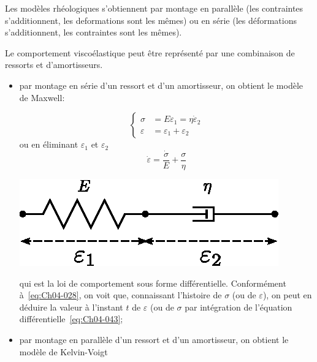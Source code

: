 Les modèles rhéologiques s'obtiennent par montage en parallèle (les contraintes s'additionnent, les deformations sont les mêmes) ou en série (les déformations s'additionnent, les contraintes sont les mêmes).

Le comportement viscoélastique peut être représenté par une combinaison de ressorts et d'amortisseurs. 
\begin{itemize}
    \item par montage en série d'un ressort et d'un amortisseur, on obtient le modèle de Maxwell:
        \begin{multicols}{2}
            \begin{equation}
                \left\{
                \begin{aligned}
                    \sigma &= E \varepsilon_1 = \eta \dot{\varepsilon}_2 \\
                    \varepsilon &= \varepsilon_1 + \varepsilon_2
                \end{aligned}
                \right.
                \label{eq:Ch04-042}
            \end{equation}
            ou en éliminant $\varepsilon_1$ et $\varepsilon_2$
            \begin{equation}
                \dot \varepsilon = \frac{\dot \sigma}{E} + \frac{\sigma}{\eta}
                \label{eq:Ch04-043}
            \end{equation}
            \columnbreak
            \begin{center}
                \includegraphics{../images/T1_Ch04-0025}
            \end{center}
        \end{multicols}
        qui est la loi de comportement sous forme différentielle.
        Conformément à~\eqref{eq:Ch04-028}, on voit que, connaissant l'histoire de $\sigma$ (ou de $\varepsilon$), on peut en déduire la valeur à l'instant $t$ de $\varepsilon$ (ou de $\sigma$ par intégration de l'équation différentielle~\eqref{eq:Ch04-043};
    \item par montage en parallèle d'un ressort et d'un amortisseur, on obtient le modèle de Kelvin-Voigt

\end{itemize}
